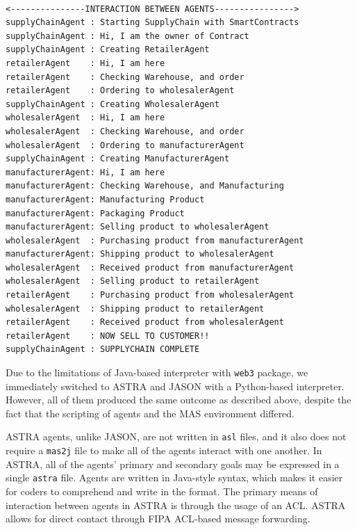 \begin{lstlisting}[numbers=none, basicstyle=\ttfamily\tiny]

<---------------INTERACTION BETWEEN AGENTS---------------->
supplyChainAgent : Starting SupplyChain with SmartContracts
supplyChainAgent : Hi, I am the owner of Contract
supplyChainAgent : Creating RetailerAgent
retailerAgent    : Hi, I am here
retailerAgent    : Checking Warehouse, and order
retailerAgent    : Ordering to wholesalerAgent
supplyChainAgent : Creating WholesalerAgent
wholesalerAgent  : Hi, I am here
wholesalerAgent  : Checking Warehouse, and order
wholesalerAgent  : Ordering to manufacturerAgent
supplyChainAgent : Creating ManufacturerAgent
manufacturerAgent: Hi, I am here
manufacturerAgent: Checking Warehouse, and Manufacturing
manufacturerAgent: Manufacturing Product
manufacturerAgent: Packaging Product
manufacturerAgent: Selling product to wholesalerAgent
wholesalerAgent  : Purchasing product from manufacturerAgent
manufacturerAgent: Shipping product to wholesalerAgent
wholesalerAgent  : Received product from manufacturerAgent
wholesalerAgent  : Selling product to retailerAgent
retailerAgent    : Purchasing product from wholesalerAgent
wholesalerAgent  : Shipping product to retailerAgent
retailerAgent    : Received product from wholesalerAgent
retailerAgent    : NOW SELL TO CUSTOMER!!
supplyChainAgent : SUPPLYCHAIN COMPLETE
\end{lstlisting}

\vspace{.5cm}

Due to the limitations of Java-based interpreter with \texttt{web3} package, we immediately switched to ASTRA and JASON with a Python-based interpreter. However, all of them produced the same outcome as described above, despite the fact that the scripting of agents and the \ac{MAS} environment differed.

\vspace{.5cm}

ASTRA agents, unlike JASON, are not written in \texttt{asl} files, and it also does not require a \texttt{mas2j} file to make all of the agents interact with one another. In ASTRA, all of the agents' primary and secondary goals may be expressed in a single \texttt{astra} file. Agents are written in Java-style syntax, which makes it easier for coders to comprehend and write in the format. The primary means of interaction between agents in ASTRA is through the usage of an \ac{ACL}. ASTRA allows for direct contact through \ac{FIPA} \ac{ACL}-based message forwarding.

